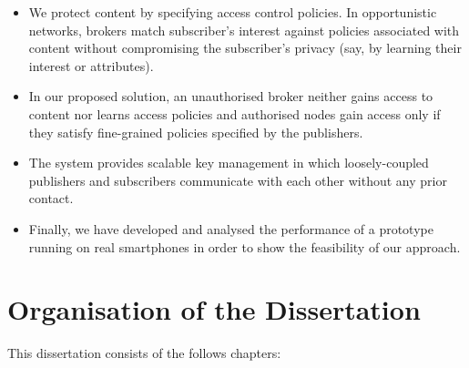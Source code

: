 \documentclass[epsfig,a4paper,11pt,titlepage]{book}
\numberwithin{algorithm}{chapter}
\begin{document}
\begin{itemize}

	\item We protect content by specifying access control policies. In opportunistic networks, brokers match subscriber's interest against policies associated with content without compromising the subscriber's privacy (say, by learning their interest or attributes).
	
	\item In our proposed solution, an unauthorised broker neither gains access to content nor learns access policies and authorised nodes gain access only if they satisfy fine-grained policies specified by the publishers.

	\item The system provides scalable key management in which loosely-coupled publishers and subscribers communicate with each other without any prior contact.
	
	\item Finally, we have developed and analysed the performance of a prototype running on real smartphones in order to show the feasibility of our approach.

\end{itemize}


\section{Organisation of the Dissertation}

This dissertation consists of the follows chapters:
\end{document}
